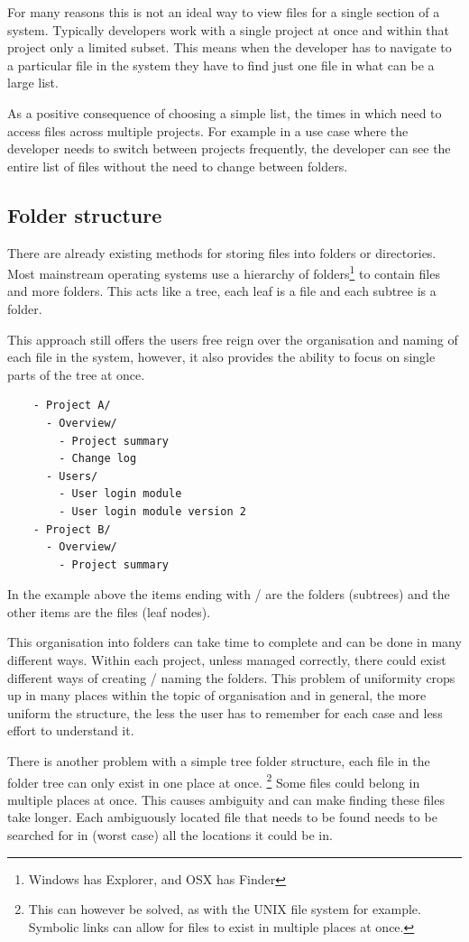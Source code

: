For many reasons this is not an ideal way to view files for a single section of a system. Typically developers work with a single project at once and within that project only a limited subset. This means when the developer has to navigate to a particular file in the system they have to find just one file in what can be a large list.


As a positive consequence of choosing a simple list, the times in which need to
access files across multiple projects. For example in a use case where the developer
needs to switch between projects frequently, the developer can see the
entire list of files without the need to change between folders.

\subsection{Folder structure}\label{folder-structure-i.e.explorer-finder}

There are already existing methods for storing files into folders or
directories. Most mainstream operating systems use a hierarchy of
folders\footnote{Windows has Explorer, and OSX has Finder} to contain files
and more folders. This acts like a tree, each leaf is a file and each subtree
is a folder.

This approach still offers the users free reign over the organisation
and naming of each file in the system, however, it also provides the
ability to focus on single parts of the tree at once.

\begin{verbatim}
    - Project A/
      - Overview/
        - Project summary
        - Change log
      - Users/
        - User login module
        - User login module version 2
    - Project B/
      - Overview/
        - Project summary
\end{verbatim}

In the example above the items ending with / are the folders (subtrees) and the
other items are the files (leaf nodes).

This organisation into folders can take time to complete and can be done in many
different ways. Within each project, unless managed correctly, there could exist
different ways of creating / naming the folders. This problem of uniformity
crops up in many places within the topic of organisation and in general, the
more uniform the structure, the less the user has to remember for each case and
less effort to understand it.

There is another problem with a simple tree folder structure, each file in the
folder tree can only exist in one place at once.%
%
\footnote{This can however be solved, as with the UNIX file system for example.
Symbolic links can allow for files to exist in multiple places at once. } Some
files could belong in multiple places at once. This causes ambiguity and can
make finding these files take longer. Each ambiguously located file that needs
to be found needs to be searched for in (worst case) all the locations it could
be in.

